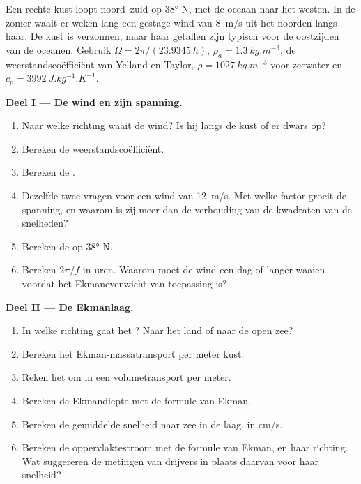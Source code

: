 \begin{problem}
\label{pb:b1:ocean-circulation:1}
Een rechte kust loopt noord--zuid op \ang{38} N, met de oceaan naar het westen. In de zomer waait er weken lang een gestage wind van \qty{8}{m/s} uit het noorden langs haar. De kust is verzonnen, maar haar getallen zijn typisch voor de oostzijden van de oceanen.
Gebruik $\Omega = 2\pi/(\qty{23.9345}{h})$, $\rho_a = \qty{1.3}{kg.m^{-3}}$, de weerstandscoëfficiënt van Yelland en Taylor, $\rho = \qty{1027}{kg.m^{-3}}$ voor zeewater en
$c_p = \qty{3992}{J.kg^{-1}.K^{-1}}$.

\medskip
\noindent\textbf{Deel I --- De wind en zijn spanning.}
\begin{enumerate}
  \item Naar welke richting waait de wind? Is hij langs de kust of er dwars op?
  \item Bereken de weerstandscoëfficiënt.
  \item Bereken de .
  \item Dezelfde twee vragen voor een wind van \qty{12}{m/s}. Met welke factor groeit de spanning, en waarom is zij meer dan de verhouding van de kwadraten van de snelheden?
  \item Bereken de  op \ang{38} N.
  \item Bereken $2\pi/f$ in uren. Waarom moet de wind een dag of langer waaien voordat het Ekmanevenwicht van toepassing is?
\end{enumerate}

\medskip
\noindent\textbf{Deel II --- De Ekmanlaag.}
\begin{enumerate}[resume]
  \item In welke richting gaat het ? Naar het land of naar de open zee?
  \item Bereken het Ekman-massatransport per meter kust.
  \item Reken het om in een volumetransport per meter.
  \item Bereken de Ekmandiepte met de formule van Ekman.
  \item Bereken de gemiddelde snelheid naar zee in de laag, in \unit{cm/s}.
  \item Bereken de oppervlaktestroom met de formule van Ekman, en haar richting. Wat suggereren de metingen van drijvers in plaats daarvan voor haar snelheid?
\end{enumerate}


\end{problem}
